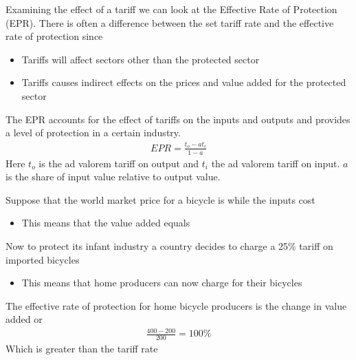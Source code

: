 \documentclass{beamer}
\begin{document}
\begin{frame}
  Examining the effect of a tariff we can look at the Effective Rate of Protection (EPR). 
  There is often a difference between the set tariff rate and the effective rate of protection since
  \begin{itemize}
    \item Tariffs will affect sectors other than the protected sector
    \item Tariffs causes indirect effects on the prices and value added for the protected sector
  \end{itemize}
\end{frame}

\begin{frame}
 The EPR accounts for the effect of tariffs on the inputs and outputs and provides a level of protection in a certain industry.
 \begin{align*}
   EPR= \frac{t_o - at_i}{1-a}
 \end{align*}
 Here $t_o$ is the ad valorem tariff on output and $t_i$ the ad valorem tariff on input. $a$ is the share of input value relative to output value.
\end{frame}

\begin{frame}
  Suppose that the world market price for a bicycle is  while the inputs cost 
  \begin{itemize}
    \item This means that the value added equals 
  \end{itemize}
  Now to protect its infant industry a country decides to charge a 25\% tariff on imported bicycles
  \begin{itemize}
    \item This means that home producers can now charge  for their bicycles
  \end{itemize}
  The effective rate of protection for home bicycle producers is the change in value added or
  \begin{align*}
    \frac{400-200}{200}=100\%
  \end{align*}
  Which is greater than the tariff rate
\end{frame}
\end{document}

